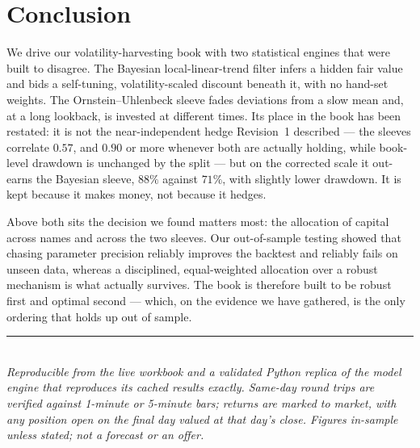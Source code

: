 \documentclass[11pt]{article}
\begin{document}
\section{Conclusion}

We drive our volatility-harvesting book with two statistical engines that were built to disagree.
The Bayesian local-linear-trend filter infers a hidden fair value and bids a self-tuning,
volatility-scaled discount beneath it, with no hand-set weights. The Ornstein--Uhlenbeck sleeve
fades deviations from a slow mean and, at a long lookback, is invested at different times. Its
place in the book has been restated: it is not the near-independent hedge Revision~1 described ---
the sleeves correlate $0.57$, and $0.90$ or more whenever both are actually holding, while
book-level drawdown is unchanged by the split --- but on the corrected scale it out-earns the
Bayesian sleeve, $88\%$ against $71\%$, with slightly lower drawdown. It is kept because it makes
money, not because it hedges.

Above both sits the decision we found matters most: the allocation of capital across names and
across the two sleeves. Our out-of-sample testing showed that chasing parameter precision
reliably improves the backtest and reliably fails on unseen data, whereas a disciplined,
equal-weighted allocation over a robust mechanism is what actually survives. The book is
therefore built to be robust first and optimal second --- which, on the evidence we have
gathered, is the only ordering that holds up out of sample.

\vfill
{\color{bcrule}\rule{\textwidth}{0.5pt}}\\[0.2em]
{\footnotesize\itshape\color{bcgrey} Reproducible from the live workbook and a validated Python
replica of the model engine that reproduces its cached results exactly. Same-day round trips are
verified against 1-minute or 5-minute bars; returns are marked to market, with any position open
on the final day valued at that day's close. Figures in-sample unless stated; not a forecast or
an offer.}
\end{document}
